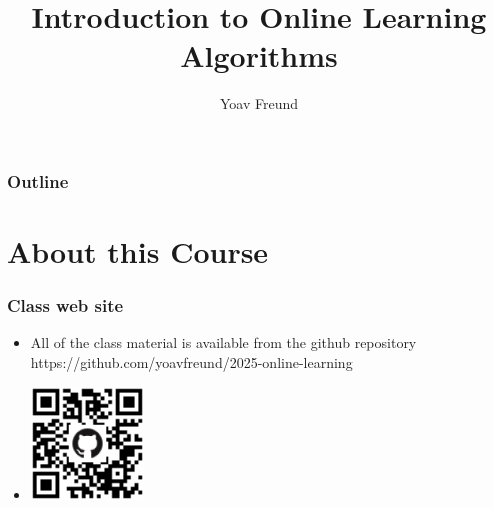 \documentclass{beamer}
\title[Introduction] %
{Introduction to Online Learning Algorithms}
\author[Freund] %
{Yoav Freund}
\institute[Universities of Somewhere and Elsewhere] %
\begin{document}
\begin{frame}
  \titlepage
\end{frame}

\begin{frame}
  \frametitle{Outline} 
  \tableofcontents
\end{frame}


\section{About this Course}
\begin{frame}
  \frametitle{Class web site}
  \begin{itemize}
  \item All of the class material is available from the github repository\\
    https://github.com/yoavfreund/2025-online-learning
  \item
    \includegraphics[height=3cm]{QRcode.png}
  \end{itemize}
\end{frame}
\end{document}
